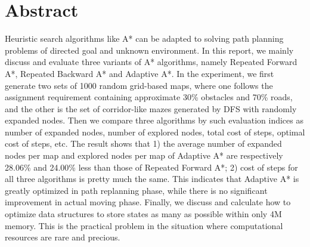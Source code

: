 \section*{Abstract}

Heuristic search algorithms like A* can be adapted to solving path planning
problems of directed goal and unknown environment. In this report, we mainly
discuss and evaluate three variants of A* algorithms, namely Repeated Forward
A*, Repeated Backward A* and Adaptive A*. In the experiment, we first generate
two sets of 1000 random grid-based maps, where one follows the assignment
requirement containing approximate 30\% obstacles and 70\% roads, and the other
is the set of corridor-like mazes generated by DFS with randomly expanded
nodes.  Then we compare three algorithms by such evaluation indices as number
of expanded nodes, number of explored nodes, total cost of steps, optimal cost
of steps, etc. The result shows that 1) the average number of expanded nodes
per map and explored nodes per map of Adaptive A* are respectively 28.06\% and
24.00\% less than those of Repeated Forward A*; 2) cost of steps for all three
algorithms is pretty much the same. This indicates that Adaptive A* is greatly
optimized in path replanning phase, while there is no significant improvement
in actual moving phase. Finally, we discuss and calculate how to optimize data
structures to store states as many as possible within only 4M memory.  This is
the practical problem in the situation where computational resources are rare
and precious.
